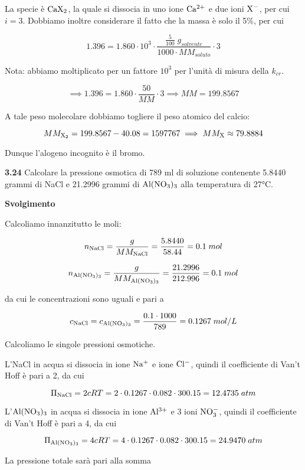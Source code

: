 La specie è $\rm CaX_2$, la quale si dissocia in uno ione $\rm Ca^{2+}$ e due ioni $\rm X^-$, per cui $i=3$. Dobbiamo inoltre considerare il fatto che la massa è solo il 5\%, per cui

$$1.396=1.860 \cdot 10^3 \cdot \frac{\displaystyle \frac{5}{100}\;g_{solvente}}{1000 \cdot MM_{soluto}} \cdot 3$$

Nota: abbiamo moltiplicato per un fattore $10^3$ per l'unità di misura della $k_{cr}$.

$$\implies
1.396=1.860 \cdot \frac{50}{MM} \cdot 3
\implies
MM=199.8567$$

A tale peso molecolare dobbiamo togliere il peso atomico del calcio:

$$MM_{\rm X_2}=199.8567-40.08=1597767
\implies
MM_{\rm X} \approx 79.8884$$

Dunque l'alogeno incognito è il bromo.

\vspace{0.2cm}\textbf{3.24} Calcolare la pressione osmotica di 789 ml di soluzione contenente 5.8440 grammi di NaCl e  21.2996 grammi di $\rm Al(NO_3)_3$ alla temperatura di 27°C.

\vspace{0.2cm}\large\textbf{Svolgimento}\normalsize

\vspace{0.2cm}Calcoliamo innanzitutto le moli:

$$n_{\rm NaCl}=\frac{g}{MM_{\rm NaCl}}
=\frac{5.8440}{58.44}=0.1\;mol$$

$$n_{\rm Al(NO_3)_3}=\frac{g}{MM_{\rm Al(NO_3)_3}}
=\frac{21.2996}{212.996}=0.1\;mol$$

da cui le concentrazioni sono uguali e pari a

$$c_{\rm NaCl}=c_{\rm Al(NO_3)_3}=\frac{0.1 \cdot 1000}{789}
=0.1267\;mol/L$$

Calcoliamo le singole pressioni osmotiche.

L'NaCl in acqua si dissocia in ione $\rm Na^+$ e ione $\rm Cl^-$, quindi il coefficiente di Van't Hoff è pari a 2, da cui

$$\Pi_{\rm NaCl}=2cRT=2 \cdot 0.1267 \cdot 0.082 \cdot 300.15=12.4735\;atm$$

L'$\rm Al(NO_3)_3$ in acqua si dissocia in ione $\rm Al^{3+}$ e 3 ioni $\rm NO_3^-$, quindi il coefficiente di Van't Hoff è pari a 4, da cui

$$\Pi_{\rm Al(NO_3)_3}=4cRT=4 \cdot 0.1267 \cdot 0.082 \cdot 300.15=24.9470\;atm$$

La pressione totale sarà pari alla somma


